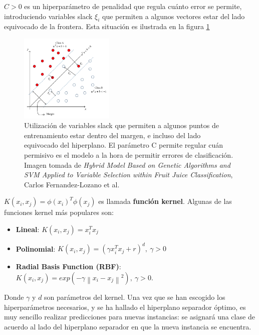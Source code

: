 $C>0$ es un hiperparámetro de penalidad que regula cuánto error se permite, introduciendo  variables slack $\xi_i$ que permiten a algunos vectores estar del lado equivocado de la frontera. Esta situación es ilustrada en la figura \ref{fig:svm_5}\\


\begin{figure}[h!]
\begin{center}
  \includegraphics[width=0.4\textwidth]{Kap1/slack.jpg} 
  \end{center}
 \caption{ Utilización de variables slack que permiten a algunos puntos de entrenamiento estar dentro del margen, e incluso del lado equivocado del hiperplano. El parámetro C permite regular cuán permisivo es el modelo a la hora de permitir errores de clasificación. Imagen tomada de \textit{Hybrid Model Based on Genetic Algorithms and SVM Applied to Variable Selection within Fruit Juice Classification}, Carlos Fernandez-Lozano et al. }
\label{fig:svm_5}
\end{figure}

$K(x_i,x_j) = \phi(x_i)^T \phi(x_j)$ es llamada \textbf{función kernel}. Algunas de las funciones kernel más populares son:

\begin{itemize}
\item \textbf{Lineal}: $K(x_i,x_j) = x_i^T x_j$
\item \textbf{Polinomial}: $K(x_i,x_j)= (\gamma x_i^T x_j + r)^d , \ \gamma > 0$
\item \textbf{Radial Basis Function (RBF)}: $K(x_i,x_j)= exp (-\gamma\left\| x_i - x_j \right\|^2  ), \ \gamma>0.$

\end{itemize}

Donde $\gamma$ y $d$ son parámetros del kernel. Una vez que se han escogido los hiperparámetros necesarios, y se ha hallado el hiperplano separador óptimo, es muy sencillo realizar predicciones para nuevas instancias: se asignará una clase de acuerdo al lado del hiperplano separador en que la nueva instancia se encuentra.  \\

